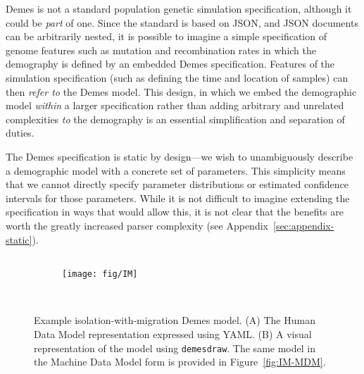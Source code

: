 \documentclass[11pt]{article}
\newcommand{\demesdraw}[0]{\texttt{demesdraw}}
\begin{document}
Demes is not a standard population genetic simulation specification,
although it could be \emph{part} of one.
Since the standard is based on JSON, and JSON documents can be
arbitrarily nested, it is possible to imagine a simple specification
of genome features such as mutation and recombination rates
in which the demography is defined by an embedded Demes specification.
Features of the simulation specification (such as defining
the time and location of samples) can then \emph{refer to} the Demes
model. This design, in which we embed the demographic model
\emph{within} a larger specification rather than adding arbitrary
and unrelated complexities \emph{to} the demography
is an essential simplification and separation of duties.

The Demes specification is static by design---we wish to unambiguously
describe a demographic model with a concrete set of parameters.
This simplicity means that we cannot directly specify parameter distributions
or estimated confidence intervals for those parameters.
While it is not difficult to imagine extending the specification in ways that
would allow this, it is not
clear that the benefits are worth the greatly increased parser complexity
(see Appendix~\ref{sec:appendix-static}).

\begin{figure}[h!]
    \begin{minipage}{0.45\textwidth}
    \begin{subfigure}{\textwidth}
    \caption{}
        \begin{tcolorbox}[equal height group=IM]
            \inputminted[fontsize=\scriptsize,numbersep=5pt]{yaml}{models/IM.yaml}
        \end{tcolorbox}
    \end{subfigure}
    \end{minipage}\hfill%
%
    \begin{minipage}{0.50\textwidth}
    \begin{subfigure}{\textwidth}
    \caption{}
        \begin{tcolorbox}[equal height group=IM, boxsep=0pt]
            \texttt{[image: fig/IM]}
        \end{tcolorbox}
    \end{subfigure}
    \end{minipage}\\

    \caption{
        \label{fig:IM}
        Example isolation-with-migration Demes model. (A) The Human Data Model
        representation expressed using YAML.
        (B) A visual representation of the model using \demesdraw.
        The same model in the Machine Data Model form is provided in
        Figure~\ref{fig:IM-MDM}.
    }
\end{figure}
\end{document}
